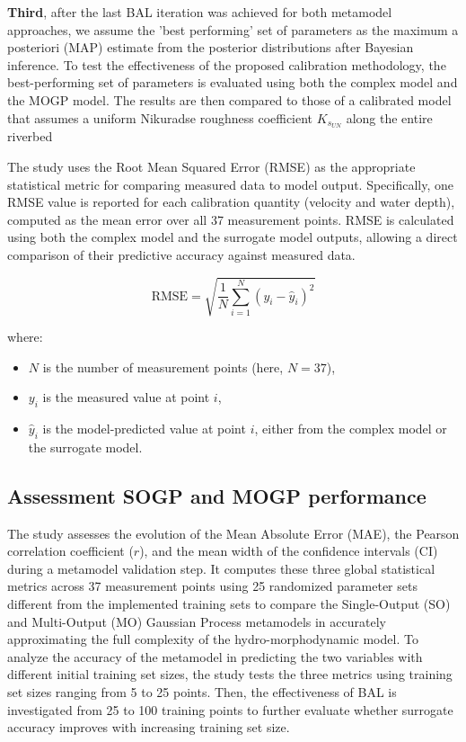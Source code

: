 \documentclass[draft,linenumbers,onecolumn]{agujournal2019} %
\begin{document}
\textbf{Third}, after the last BAL iteration was achieved for both metamodel approaches, we assume the 'best performing' set of parameters as the maximum a posteriori (MAP) estimate from the posterior distributions after Bayesian inference. To test the effectiveness of the proposed calibration methodology, the best-performing set of parameters is evaluated using both the complex model and the MOGP model. The results are then compared to those of a calibrated model that assumes a uniform Nikuradse roughness coefficient \(K_{s_{UN}}\) along the entire riverbed

The study uses the Root Mean Squared Error (RMSE) as the appropriate statistical metric for comparing measured data to model output. Specifically, one RMSE value is reported for each calibration quantity (velocity and water depth), computed as the mean error over all 37 measurement points. RMSE is calculated using both the complex model and the surrogate model outputs, allowing a direct comparison of their predictive accuracy against measured data.

\begin{equation}
	\text{RMSE} = \sqrt{ \frac{1}{N} \sum_{i=1}^{N} (y_i - \hat{y}_i)^2 }
\end{equation}

where:
\begin{itemize}
	\item $N$ is the number of measurement points (here, $N = 37$),
	\item $y_i$ is the measured value at point $i$,
	\item $\hat{y}_i$ is the model-predicted value at point $i$, either from the complex model or the surrogate model.
\end{itemize}


\subsection{Assessment SOGP and MOGP performance}
\label{sec:sec2.8}
The study assesses the evolution of the Mean Absolute Error (MAE), the Pearson correlation coefficient ($r$), and the mean width of the confidence intervals (CI) during a metamodel validation step. It computes these three global statistical metrics across 37 measurement points using 25 randomized parameter sets different from the implemented training sets to compare the Single-Output (SO) and Multi-Output (MO) Gaussian Process metamodels in accurately approximating the full complexity of the hydro-morphodynamic model. To analyze the accuracy of the metamodel in predicting the two variables with different initial training set sizes, the study tests the three metrics using training set sizes ranging from 5 to 25 points. Then, the effectiveness of BAL is investigated from 25 to 100 training points to further evaluate whether surrogate accuracy improves with increasing training set size. 
\end{document}
